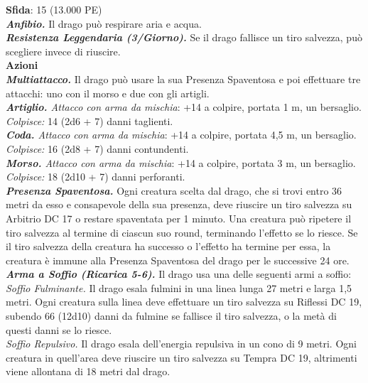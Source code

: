 \begin{multicols}{2}
\textbf{Sfida}: 15 (13.000 PE)\smallskip\\
\emph{\textbf{Anfibio.}} Il drago può respirare aria e acqua.\\
\emph{\textbf{Resistenza Leggendaria (3/Giorno).}} Se il drago fallisce un tiro salvezza, può scegliere invece di riuscire.\\
\smallskip\textbf{Azioni}\\
\emph{\textbf{Multiattacco.}} Il drago può usare la sua Presenza Spaventosa e poi effettuare tre attacchi: uno con il morso e due con gli artigli.\\
\emph{\textbf{Artiglio.} Attacco con arma da mischia}: +14 a colpire, portata 1 m, un bersaglio.\\
\emph{Colpisce:} 14 (2d6 + 7) danni taglienti.\\
\emph{\textbf{Coda.} Attacco con arma da mischia}: +14 a colpire, portata 4,5 m, un bersaglio.\\
\emph{Colpisce:} 16 (2d8 + 7) danni contundenti.\\
\emph{\textbf{Morso.} Attacco con arma da mischia}: +14 a colpire, portata 3 m, un bersaglio.\\
\emph{Colpisce:} 18 (2d10 + 7) danni perforanti.\\
\emph{\textbf{Presenza Spaventosa.}} Ogni creatura scelta dal drago, che si trovi entro 36 metri da esso e consapevole della sua presenza, deve riuscire un tiro salvezza su Arbitrio DC 17 o restare spaventata per 1 minuto. Una creatura può ripetere il tiro salvezza al termine di ciascun suo round, terminando l'effetto se lo riesce. Se il tiro salvezza della creatura ha successo o l'effetto ha termine per essa, la creatura è immune alla Presenza Spaventosa del drago per le successive 24 ore.\\
\emph{\textbf{Arma a Soffio (Ricarica 5-6).}} Il drago usa una delle seguenti armi a soffio:\\
\emph{Soffio Fulminante.} Il drago esala fulmini in una linea lunga 27 metri e larga 1,5 metri. Ogni creatura sulla linea deve effettuare un tiro salvezza su Riflessi DC 19, subendo 66 (12d10) danni da fulmine se fallisce il tiro salvezza, o la metà di questi danni se lo riesce.\\
\emph{Soffio Repulsivo.} Il drago esala dell'energia repulsiva in un cono di 9 metri. Ogni creatura in quell'area deve riuscire un tiro salvezza su Tempra DC 19, altrimenti viene allontana di 18 metri dal drago.\\


\end{multicols}
